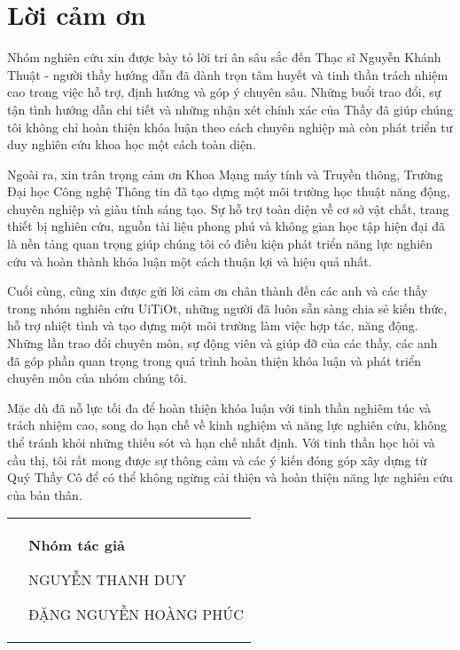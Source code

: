 \chapter*{Lời cảm ơn}
Nhóm nghiên cứu xin được bày tỏ lời tri ân sâu sắc đến Thạc sĩ Nguyễn Khánh Thuật - người thầy hướng dẫn đã dành trọn tâm huyết và tinh thần trách nhiệm cao trong việc hỗ trợ, định hướng và góp ý chuyên sâu. Những buổi trao đổi, sự tận tình hướng dẫn chi tiết và những nhận xét chính xác của Thầy đã giúp chúng tôi không chỉ hoàn thiện khóa luận theo cách chuyên nghiệp mà còn phát triển tư duy nghiên cứu khoa học một cách toàn diện.

Ngoài ra, xin trân trọng cảm ơn Khoa Mạng máy tính và Truyền thông, Trường Đại học Công nghệ Thông tin đã tạo dựng một môi trường học thuật năng động, chuyên nghiệp và giàu tính sáng tạo. Sự hỗ trợ toàn diện về cơ sở vật chất, trang thiết bị nghiên cứu, nguồn tài liệu phong phú và không gian học tập hiện đại đã là nền tảng quan trọng giúp chúng tôi có điều kiện phát triển năng lực nghiên cứu và hoàn thành khóa luận một cách thuận lợi và hiệu quả nhất.

Cuối cùng, cũng xin được gửi lời cảm ơn chân thành đến các anh và các thầy trong nhóm nghiên cứu UiTiOt, những người đã luôn sẵn sàng chia sẻ kiến thức, hỗ trợ nhiệt tình và tạo dựng một môi trường làm việc hợp tác, năng động. Những lần trao đổi chuyên môn, sự động viên và giúp đỡ của các thầy, các anh đã góp phần quan trọng trong quá trình hoàn thiện khóa luận và phát triển chuyên môn của nhóm chúng tôi.

Mặc dù đã nỗ lực tối đa để hoàn thiện khóa luận với tinh thần nghiêm túc và trách nhiệm cao, song do hạn chế về kinh nghiệm và năng lực nghiên cứu, không thể tránh khỏi những thiếu sót và hạn chế nhất định. Với tinh thần học hỏi và cầu thị, tôi rất mong được sự thông cảm và các ý kiến đóng góp xây dựng từ Quý Thầy Cô để có thể không ngừng cải thiện và hoàn thiện năng lực nghiên cứu của bản thân.
{
\begin{table}[ht]
\centering
\begin{tabular}{>{\centering}m{}>{\centering\arraybackslash}m{}}
 & \textbf{Nhóm tác giả}
 
 NGUYỄN THANH DUY
 
 ĐẶNG NGUYỄN HOÀNG PHÚC
\end{tabular}
\end{table}
}